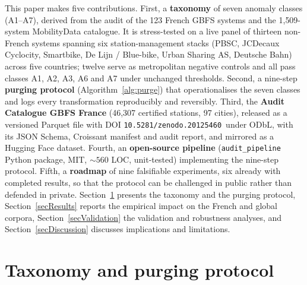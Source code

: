 \documentclass[11pt,a4paper]{article}
\newif\ifanonymous
\newcommand{\zdoi}{\ifanonymous\texttt{[deposited on Zenodo; DOI withheld for review]}\else\texttt{10.5281/zenodo.20125460}\fi}
\begin{document}
This paper makes five contributions. First, a \textbf{taxonomy} of seven
anomaly classes (A1--A7), derived from the audit of the 123 French GBFS
systems and the 1{,}509-system MobilityData catalogue. It is stress-tested
on a live panel of thirteen non-French systems spanning six
station-management stacks (PBSC, JCDecaux Cyclocity, Smartbike, De Lijn /
Blue-bike, Urban Sharing AS, Deutsche Bahn) across five countries; twelve
serve as metropolitan negative controls and all pass classes A1, A2, A3,
A6 and A7 under unchanged thresholds. Second, a nine-step \textbf{purging
protocol} (Algorithm~\ref{alg:purge}) that operationalises the seven
classes and logs every transformation reproducibly and reversibly. Third,
the \textbf{Audit Catalogue GBFS France} (46{,}307 certified stations,
97 cities), released as a versioned Parquet file with DOI
\zdoi\ under ODbL, with its JSON Schema,
Croissant manifest and audit report, and mirrored as a Hugging Face
dataset. Fourth, an \textbf{open-source pipeline}
(\texttt{audit\_pipeline} Python package, MIT, $\sim 560$ LOC,
unit-tested) implementing the nine-step protocol. Fifth, a
\textbf{roadmap} of nine falsifiable
experiments, six already with completed results, so that the protocol can
be challenged in public rather than defended in private.
Section~\ref{secTaxProtocol} presents the taxonomy and the purging
protocol, Section~\ref{secResults} reports the empirical impact on the
French and global corpora, Section~\ref{secValidation} the validation and
robustness analyses, and Section~\ref{secDiscussion} discusses
implications and limitations.


\section{Taxonomy and purging protocol}\label{secTaxProtocol}
\end{document}

